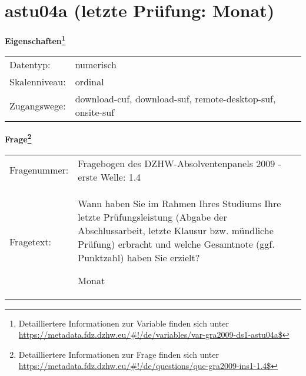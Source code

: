 
    \setcounter{footnote}{0}

    \vspace*{-1.8cm}
	\section{astu04a (letzte Prüfung: Monat)}
	\label{section:astu04a}



    \vspace*{0.5cm}
    \noindent\textbf{Eigenschaften\footnote{Detailliertere Informationen zur Variable finden sich unter
		\url{https://metadata.fdz.dzhw.eu/\#!/de/variables/var-gra2009-ds1-astu04a$}}}\\
	\begin{tabularx}{\hsize}{@{}lX}
	Datentyp: & numerisch \\
	Skalenniveau: & ordinal \\
	Zugangswege: &
	  download-cuf, 
	  download-suf, 
	  remote-desktop-suf, 
	  onsite-suf
 \\
    \end{tabularx}



				\vspace*{0.5cm}
                \noindent\textbf{Frage\footnote{Detailliertere Informationen zur Frage finden sich unter
		              \url{https://metadata.fdz.dzhw.eu/\#!/de/questions/que-gra2009-ins1-1.4$}}}\\
				\begin{tabularx}{\hsize}{@{}lX}
					Fragenummer: &
					  Fragebogen des DZHW-Absolventenpanels 2009 - erste Welle:
					  1.4
 \\
					Fragetext: & Wann haben Sie im Rahmen Ihres Studiums Ihre letzte Prüfungsleistung (Abgabe der Abschlussarbeit, letzte Klausur bzw. mündliche Prüfung) erbracht und welche Gesamtnote (ggf. Punktzahl) haben Sie erzielt?\par  Monat \\
				\end{tabularx}





